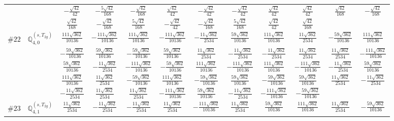 \documentclass[fleqn,9pt,landscape]{jsarticle}
\begin{document}
\begin{center}
\begin{longtable}{lcccccccccc}
& $ - \frac{\sqrt{42}}{42} $ & $ - \frac{5 \sqrt{42}}{168} $ & $ - \frac{\sqrt{42}}{168} $ & $ \frac{\sqrt{42}}{42} $ & $ - \frac{\sqrt{42}}{42} $ & $ - \frac{\sqrt{42}}{42} $ & $ \frac{\sqrt{42}}{42} $ & $ \frac{\sqrt{42}}{42} $ & $ \frac{\sqrt{42}}{168} $ & $ - \frac{\sqrt{42}}{168} $ \\
& $ \frac{\sqrt{42}}{168} $ & $ - \frac{\sqrt{42}}{168} $ & $ \frac{5 \sqrt{42}}{168} $ & $ - \frac{\sqrt{42}}{42} $ & $ - \frac{\sqrt{42}}{168} $ & $ \frac{5 \sqrt{42}}{168} $ & $ \frac{\sqrt{42}}{42} $ & $ \frac{\sqrt{42}}{168} $ & $  $ & $  $ \\ \hline
$ \#22\quad \mathbb{Q}_{4,0}^{(s,T_{2g})} $ & $ \frac{111 \sqrt{362}}{10136} $ & $ - \frac{111 \sqrt{362}}{10136} $ & $ \frac{111 \sqrt{362}}{10136} $ & $ - \frac{111 \sqrt{362}}{10136} $ & $ - \frac{11 \sqrt{362}}{2534} $ & $ \frac{59 \sqrt{362}}{10136} $ & $ \frac{111 \sqrt{362}}{10136} $ & $ \frac{11 \sqrt{362}}{2534} $ & $ - \frac{59 \sqrt{362}}{10136} $ & $ \frac{111 \sqrt{362}}{10136} $ \\
& $ - \frac{59 \sqrt{362}}{10136} $ & $ \frac{59 \sqrt{362}}{10136} $ & $ - \frac{59 \sqrt{362}}{10136} $ & $ \frac{59 \sqrt{362}}{10136} $ & $ \frac{11 \sqrt{362}}{2534} $ & $ - \frac{11 \sqrt{362}}{2534} $ & $ - \frac{11 \sqrt{362}}{2534} $ & $ \frac{11 \sqrt{362}}{2534} $ & $ \frac{11 \sqrt{362}}{2534} $ & $ - \frac{111 \sqrt{362}}{10136} $ \\
& $ \frac{59 \sqrt{362}}{10136} $ & $ - \frac{11 \sqrt{362}}{2534} $ & $ - \frac{111 \sqrt{362}}{10136} $ & $ - \frac{59 \sqrt{362}}{10136} $ & $ \frac{111 \sqrt{362}}{10136} $ & $ - \frac{111 \sqrt{362}}{10136} $ & $ \frac{111 \sqrt{362}}{10136} $ & $ - \frac{111 \sqrt{362}}{10136} $ & $ - \frac{11 \sqrt{362}}{2534} $ & $ \frac{59 \sqrt{362}}{10136} $ \\
& $ \frac{111 \sqrt{362}}{10136} $ & $ \frac{11 \sqrt{362}}{2534} $ & $ - \frac{59 \sqrt{362}}{10136} $ & $ \frac{111 \sqrt{362}}{10136} $ & $ - \frac{59 \sqrt{362}}{10136} $ & $ \frac{59 \sqrt{362}}{10136} $ & $ - \frac{59 \sqrt{362}}{10136} $ & $ \frac{59 \sqrt{362}}{10136} $ & $ \frac{11 \sqrt{362}}{2534} $ & $ - \frac{11 \sqrt{362}}{2534} $ \\
& $ - \frac{11 \sqrt{362}}{2534} $ & $ \frac{11 \sqrt{362}}{2534} $ & $ \frac{11 \sqrt{362}}{2534} $ & $ - \frac{111 \sqrt{362}}{10136} $ & $ \frac{59 \sqrt{362}}{10136} $ & $ - \frac{11 \sqrt{362}}{2534} $ & $ - \frac{111 \sqrt{362}}{10136} $ & $ - \frac{59 \sqrt{362}}{10136} $ & $  $ & $  $ \\ \hline
$ \#23\quad \mathbb{Q}_{4,1}^{(s,T_{2g})} $ & $ \frac{11 \sqrt{362}}{2534} $ & $ - \frac{11 \sqrt{362}}{2534} $ & $ - \frac{11 \sqrt{362}}{2534} $ & $ \frac{11 \sqrt{362}}{2534} $ & $ - \frac{111 \sqrt{362}}{10136} $ & $ \frac{11 \sqrt{362}}{2534} $ & $ \frac{59 \sqrt{362}}{10136} $ & $ \frac{111 \sqrt{362}}{10136} $ & $ \frac{11 \sqrt{362}}{2534} $ & $ - \frac{59 \sqrt{362}}{10136} $ \\

\end{longtable}
\end{center}
\end{document}
